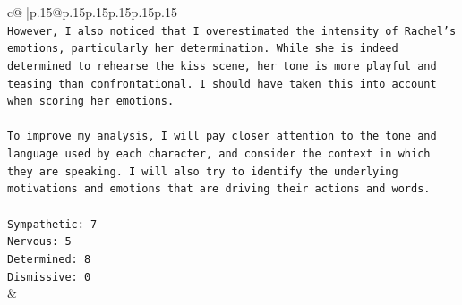\documentclass{article}
\begin{document}
{\begin{supertabular}{c@{$\;$}|p{.15\linewidth}@{}p{.15\linewidth}p{.15\linewidth}p{.15\linewidth}p{.15\linewidth}p{.15\linewidth}}
{{{\\ 
\texttt{However, I also noticed that I overestimated the intensity of Rachel's emotions, particularly her determination. While she is indeed determined to rehearse the kiss scene, her tone is more playful and teasing than confrontational. I should have taken this into account when scoring her emotions.} \\
\\ 
\texttt{To improve my analysis, I will pay closer attention to the tone and language used by each character, and consider the context in which they are speaking. I will also try to identify the underlying motivations and emotions that are driving their actions and words.} \\
\\ 
\texttt{Sympathetic: 7} \\
\texttt{Nervous: 5} \\
\texttt{Determined: 8} \\
\texttt{Dismissive: 0} \\
            }
        }
    }
    & \\ \\

\end{supertabular}
}
\end{document}
